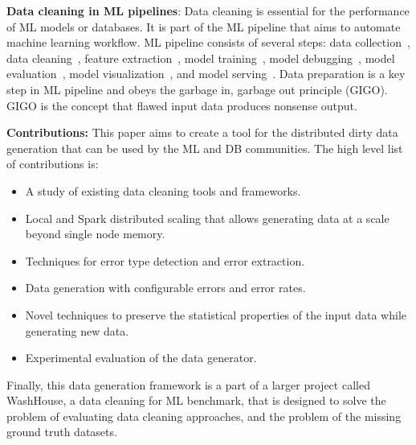 
\textbf{Data cleaning in ML pipelines}: 
Data cleaning is essential for the performance of ML models or databases.
It is part of the ML pipeline that aims to automate machine learning workflow. 
ML pipeline consists of several steps: data collection~\cite{LiDLMS2015}, data cleaning~\cite{raha, baran, RekatsinasCIR2017, HeidariMIR2019, activeclean, alphaclean, cleanml, HammerST05}, feature extraction~\cite{ShahLKYK2021}, model training~\cite{RekatsinasCIR2017}, model debugging~\cite{SagadeevaB2021, autoweka, LiJDRT2017, KangRBZ2020, KandasamyNSPX2018}, model evaluation~\cite{generalizing_confusion_matrix, Ribeiro0G16}, model visualization~\cite{NakandalaKP2019, CrottyGZBK2015, SimonyanVZ2013}, and model serving~\cite{OlstonFGHLLRR2017, Lee2018, WeiGZWCNOSR2018}.
Data preparation is a key step in ML pipeline and obeys the garbage in, garbage out principle (GIGO).
GIGO is the concept that flawed input data produces nonsense output.

\textbf{Contributions:} 
This paper aims to create a tool for the distributed dirty data generation that can be used by the ML and DB communities. 
The high level list of contributions is:

\begin{itemize}
    \item A study of existing data cleaning tools and frameworks.
    \item Local and Spark distributed scaling that allows generating data at a scale beyond single node memory.
    \item Techniques for error type detection and error extraction.
    \item Data generation with configurable errors and error rates.
    \item Novel techniques to preserve the statistical properties of the input data while generating new data.
    \item Experimental evaluation of the data generator.
\end{itemize}

Finally, this data generation framework is a part of a larger project called WashHouse, a data cleaning for ML benchmark, that is designed to solve the problem of evaluating data cleaning approaches, and the problem of the missing ground truth datasets.


